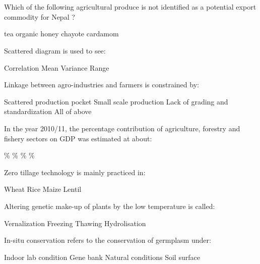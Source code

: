 \section*{}

\subsection*{}

\begin{questions}

\question Which of the following agricultural produce is not identified as a potential export commodity for Nepal ?
  \begin{choices}
  \choice tea
  \choice organic honey
  \choice chayote
  \choice cardamom
  \end{choices}

\question Scattered diagram is used to see:
  \begin{choices}
  \choice Correlation
  \choice Mean
  \choice Variance
  \choice Range
  \end{choices}

\question Linkage between agro-industries and farmers is constrained by:
  \begin{choices}
  \choice Scattered production pocket
  \choice Small scale production
  \choice Lack of grading and standardization
  \choice All of above
  \end{choices}

\question In the year 2010/11, the percentage contribution of agriculture, forestry and fishery sectors on GDP was estimated at about:
  \begin{choices}
  \%
  \%
  \%
  \%
  \end{choices}

\question Zero tillage technology is mainly practiced in:
  \begin{choices}
  \choice Wheat
  \choice Rice
  \choice Maize
  \choice Lentil
  \end{choices}

\question Altering genetic make-up of plants by the low temperature is called:
  \begin{choices}
  \choice Vernalization
  \choice Freezing
  \choice Thawing
  \choice Hydrolisation
  \end{choices}

\question In-situ conservation refers to the conservation of germplasm under:
  \begin{choices}
  \choice Indoor lab condition
  \choice Gene bank
  \choice Natural conditions
  \choice Soil surface
  \end{choices}


\end{questions}
